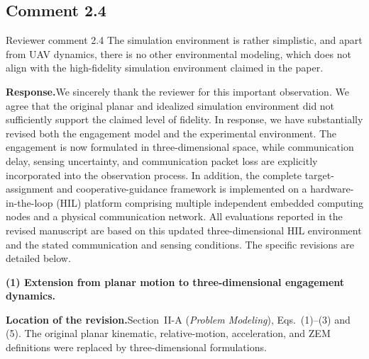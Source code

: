 \documentclass[11pt]{article}
\newcommand{\rsp}{\medskip\noindent\textbf{Response.}\quad}
\newcommand{\loc}{\medskip\noindent\textbf{Location of the revision.}\quad}
\begin{document}
\subsection*{Comment 2.4}

\begin{reviewercomment}{Reviewer comment 2.4}
The simulation environment is rather simplistic, and apart from UAV dynamics,
there is no other environmental modeling, which does not align with the
high-fidelity simulation environment claimed in the paper.
\end{reviewercomment}

\rsp We sincerely thank the reviewer for this important observation. We agree
that the original planar and idealized simulation environment did not
sufficiently support the claimed level of fidelity. In response, we have
substantially revised both the engagement model and the experimental
environment. The engagement is now formulated in three-dimensional space,
while communication delay, sensing uncertainty, and communication packet loss
are explicitly incorporated into the observation process. In addition, the
complete target-assignment and cooperative-guidance framework is implemented
on a hardware-in-the-loop (HIL) platform comprising multiple independent embedded
computing nodes and a physical communication network. 
All evaluations reported in the revised manuscript are based on this updated three-dimensional HIL
environment and the stated communication and sensing conditions. 
The specific revisions are detailed below.

\medskip
\noindent\textbf{(1) Extension from planar motion to three-dimensional
engagement dynamics.}

\loc Section~II-A (\emph{Problem Modeling}), Eqs.~(1)--(3) and (5).
The original planar kinematic, relative-motion, acceleration, and ZEM
definitions were replaced by three-dimensional formulations.
\end{document}
